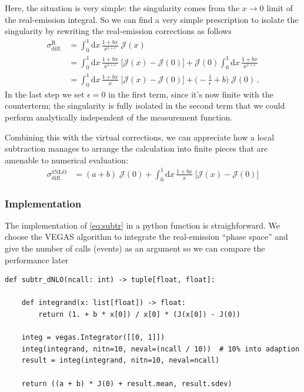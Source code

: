 \documentclass[11pt]{article}
\begin{document}
Here, the situation is very simple: the singularity comes from the \(x\to0\) limit of the real-emission integral.
So we can find a very simple prescription to isolate the singularity by rewriting the real-emission corrections as follows
\begin{align}
  \sigma^\mathrm{R}_\mathrm{diff.}
  &=
  \int_0^1\mathrm{d}x\,\frac{1+bx}{x^{1+\epsilon}}
  \;\mathcal{J}(x)
  \nonumber\\&=
  \int_0^1\mathrm{d}x\,\frac{1+bx}{x^{1+\epsilon}}
  \;\Big[\mathcal{J}(x) - \mathcal{J}(0)\Bigr]
  + \mathcal{J}(0)
  \int_0^1\mathrm{d}x\,\frac{1+bx}{x^{1+\epsilon}}
  \nonumber\\&=
  \int_0^1\mathrm{d}x\,\frac{1+bx}{x}
  \;\Big[\mathcal{J}(x) - \mathcal{J}(0)\bigr]
  +\biggl( -\frac{1}{\epsilon} + b \biggr) \;\mathcal{J}(0)
  \,.
\end{align}
In the last step we set \(\epsilon=0\) in the first term, since it's now finite with the counterterm; the singularity is fully isolated in the second term that we could perform analytically independent of the measurement function.

Combining this with the virtual corrections, we can appreciate how a local subtraction manages to arrange the calculation into finite pieces that are amenable to numerical evaluation:
\begin{align}
\label{eq:subtr}
  \sigma^\mathrm{\delta NLO}_\mathrm{diff.}
  &=
  (a + b) \;\mathcal{J}(0)
  +\int_0^1\mathrm{d}x\,\frac{1+bx}{x}
  \;\Big[\mathcal{J}(x) - \mathcal{J}(0)\Bigr]
\end{align}

\subsubsection{Implementation}
\label{sec:orgdf0aff9}
The implementation of \eqref{eq:subtr} in a python function is straighforward.
We choose the VEGAS algorithm to integrate the real-emission ``phase space'' and give the number of calls (events) as an argument so we can compare the performance later
\begin{verbatim}
def subtr_dNLO(ncall: int) -> tuple[float, float]:

    def integrand(x: list[float]) -> float:
        return (1. + b * x[0]) / x[0] * (J(x[0]) - J(0))

    integ = vegas.Integrator([[0, 1]])
    integ(integrand, nitn=10, neval=(ncall / 10))  # 10% into adaption
    result = integ(integrand, nitn=10, neval=ncall)

    return ((a + b) * J(0) + result.mean, result.sdev)
\end{verbatim}
\end{document}
